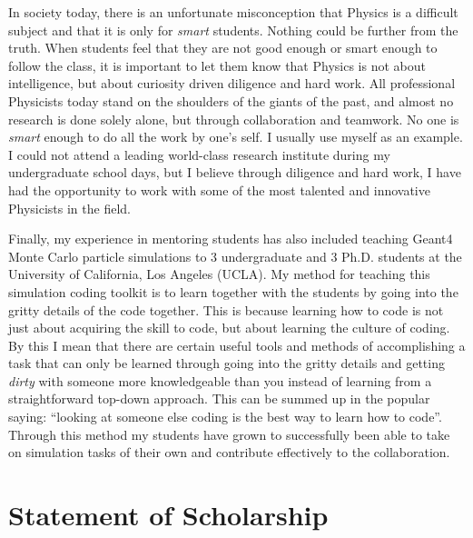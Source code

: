 \documentclass[10pt]{article} %
\begin{document}
In society today, there is an unfortunate misconception that Physics is a
difficult subject and that it is only for \textit{smart} students. Nothing
could be further from the truth. When students feel that they are not good
enough or smart enough to follow the class, it is important to let them know
that Physics is not about intelligence, but about curiosity driven diligence
and hard work. All professional Physicists today stand on the shoulders of the
giants of the past, and almost no research is done solely alone, but through
collaboration and teamwork. No one is \textit{smart} enough to do all the work
by one's self. I usually use myself as an example. I could not attend a leading
world-class research institute during my undergraduate school days, but I
believe through diligence and hard work, I have had the opportunity to work
with some of the most talented and innovative Physicists in the field.

Finally, my experience in mentoring students has also included teaching Geant4
Monte Carlo particle simulations to 3 undergraduate and 3 Ph.D. students at the
University of California, Los Angeles (UCLA). My method for teaching this
simulation coding toolkit is to learn together with the students by going into
the gritty details of the code together. This is because learning how to code
is not just about acquiring the skill to code, but about learning the culture
of coding. By this I mean that there are certain useful tools and methods of
accomplishing a task that can only be learned through going into the gritty
details and getting \textit{dirty} with someone more knowledgeable than you
instead of learning from a straightforward top-down approach. This can be
summed up in the popular saying: ``looking at someone else coding is the best
way to learn how to code''. Through this method my students have grown to
successfully been able to take on simulation tasks of their own and contribute
effectively to the collaboration.


\clearpage
\section{Statement of Scholarship}
\end{document}
